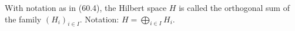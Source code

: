With notation as in (60.4), the Hilbert space $H$ is called the orthogonal sum of the family $(H_i)_{i \in I}$. Notation: $H = \bigoplus_{i \in I} H_i$.
